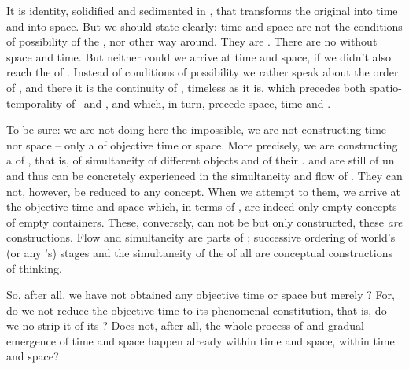 \label{sub:ObjConst}

\pa\label{pa:objecttemp} It is identity, solidified and sedimented in
, that transforms the original  into time and
 into space.  But we should state clearly: time and space are not
the conditions of possibility of the , nor other way around.  They
are \equi.  There are no  without space and time.  But neither could
we arrive at time and space, if we didn't also reach the
  of .  Instead of conditions of possibility we
rather speak about the order of , and there it is the continuity of
\pexp, timeless as it is, which precedes both spatio-temporality of \hoa\ and
, and which, in turn, precede space, time and .

To be sure: we are not doing here the impossible, we are not constructing
 time nor space -- only a  of objective time or
space.  More precisely, we are constructing a  of
, that is, of simultaneity of different objects and of their
.   and  are still 
of un and thus can be concretely experienced in the
simultaneity and flow of . They can not, however, be reduced to
any concept. When we attempt to  them, we arrive at the objective
time and space which, in terms of , are indeed only empty
concepts of empty containers.  These, conversely, can not be 
but only constructed, these {\em are} constructions.  Flow and
simultaneity are 
parts of ; successive ordering of world's (or any 's)
stages and the simultaneity of the  of all  are
conceptual constructions of  thinking.

\pa So, after all, we have not obtained any objective time or space but merely
 ?  For, do we not reduce the {objective}
time to its phenomenal constitution, that is, do we no strip it of its
?  Does not, after all, the whole process of
 and gradual emergence of time and space happen already
within time and space, within  time and space?

